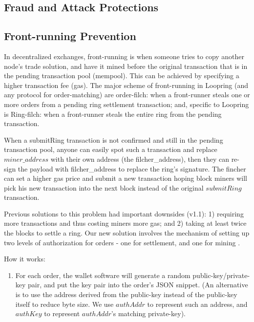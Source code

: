 \documentclass[UTF8,nofonts]{article}
\begin{document}
\begin{multicols}{2}
\section{Fraud and Attack Protections}

\subsection{Front-running Prevention\label{sec:dual_authoring}}

In decentralized exchanges, front-running is when someone tries to copy another node's trade solution, and have it mined before the original transaction that is in the pending transaction pool (mempool). This can be achieved by specifying a higher transaction fee (gas). The major scheme of front-running in Loopring (and any protocol for order-matching) are order-filch: when a front-runner steals one or more orders from a pending ring settlement transaction; and, specific to Loopring is Ring-filch: when a front-runner steals the entire ring from the pending transaction.

When a submitRing transaction is not confirmed and still in the pending transaction pool, anyone can easily spot such a transaction and replace $miner\_address$ with their own address (the filcher\_address), then they can re-sign the payload with filcher\_address to replace the ring's signature. The fincher can set a higher gas price and submit a new transaction hoping block miners will pick his new transaction into the next block instead of the original $submitRing$ transaction.

Previous solutions to this problem had important downsides (v1.1): 1) requiring more transactions and thus costing miners more gas; and 2) taking at least twice the blocks to settle a ring.  Our new solution involves the mechanism of setting up two levels of authorization for orders - one for settlement, and one for mining \cite{dualauthor}.

How it works:

\begin{enumerate}

	\item For each order, the wallet software will generate a random public-key/private-key pair, and put the key pair into the order's JSON snippet. (An alternative is to use the address derived from the public-key instead of the public-key itself to reduce byte size. We use $authAddr$ to represent such an address, and $authKey$ to represent $authAddr$'s matching private-key).


\end{enumerate}
\end{multicols}
\end{document}
